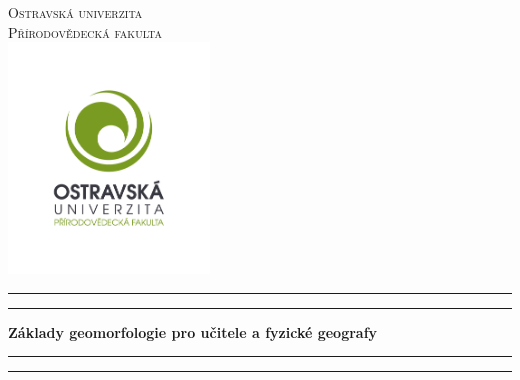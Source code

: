 

\thispagestyle{empty}	
\begin{center} %
	
	\vspace*{5ex}
	\textsc{\LARGE Ostravská univerzita}\\[0.5cm] %
	
	\textsc{\Large Přírodovědecká fakulta}\\[1cm] %
	
	\includegraphics[width=0.4\textwidth]{obrazky/logo/logo_cze.png}\\
	
	
	\rule{\textwidth}{1.6pt}\vspace*{-\baselineskip}\vspace*{2pt} %
	\rule{\textwidth}{0.4pt} %

	\vspace{0.75\baselineskip} %
	
	{\huge\bfseries Základy geomorfologie pro učitele a fyzické geografy}\\[0.4cm] %
	
	\rule{\textwidth}{0.4pt}\vspace*{-\baselineskip}\vspace{3.2pt} %
	\rule{\textwidth}{1.6pt} %

	\vspace{2\baselineskip} %


\end{center}
